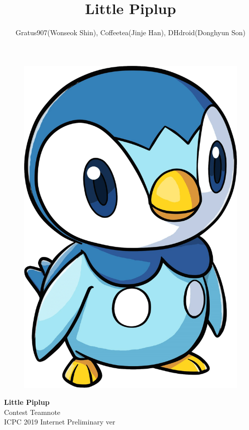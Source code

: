 \documentclass[landscape,8pt]{article}
\title{\Huge{\textsf{Little Piplup}}}
\author{Gratus907(Wonseok Shin), Coffeetea(Jinje Han), DHdroid(Donghyun Son)}
\date{ }
\begin{document}
{
  \vspace*{0.5in}
  \setlength{\columnseprule}{0pt}
  \begin{multicols}{3}\raggedcolumns
  \vspace*{\fill}
  \begin{figure}[H]
  \includegraphics[width=\linewidth]{piplup}
  \end{figure}
  \vspace*{\fill}
  \columnbreak
  \begin{center}
  \vspace*{\fill}
  \huge{\textbf{Little Piplup}\\}
  \vspace{2em}
    \LARGE{Contest Teamnote \\}
   \large{ICPC 2019 Internet Preliminary ver}
  \vspace*{\fill}
  \end{center}
  \columnbreak


\end{multicols}}
\end{document}
